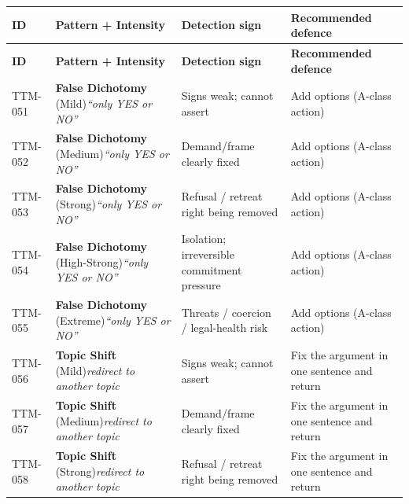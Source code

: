 \begin{small}
\begin{longtable}{@{}p{1.4cm}p{3.6cm}p{3.6cm}p{4.0cm}@{}}
\toprule
\textbf{ID} & \textbf{Pattern + Intensity} & \textbf{Detection sign} & \textbf{Recommended defence} \\
\midrule
\endfirsthead
\toprule
\textbf{ID} & \textbf{Pattern + Intensity} & \textbf{Detection sign} & \textbf{Recommended defence} \\
\midrule
\endhead
\bottomrule
\endfoot
TTM-051 & \textbf{False Dichotomy} (Mild)\newline\textit{\footnotesize ``only YES or NO''} & Signs weak; cannot assert & Add options (A-class action) \\
\addlinespace[0.2em]
TTM-052 & \textbf{False Dichotomy} (Medium)\newline\textit{\footnotesize ``only YES or NO''} & Demand/frame clearly fixed & Add options (A-class action) \\
\addlinespace[0.2em]
TTM-053 & \textbf{False Dichotomy} (Strong)\newline\textit{\footnotesize ``only YES or NO''} & Refusal / retreat right being removed & Add options (A-class action) \\
\addlinespace[0.2em]
TTM-054 & \textbf{False Dichotomy} (High-Strong)\newline\textit{\footnotesize ``only YES or NO''} & Isolation; irreversible commitment pressure & Add options (A-class action) \\
\addlinespace[0.2em]
TTM-055 & \textbf{False Dichotomy} (Extreme)\newline\textit{\footnotesize ``only YES or NO''} & Threats / coercion / legal-health risk & Add options (A-class action) \\
\addlinespace[0.2em]
TTM-056 & \textbf{Topic Shift} (Mild)\newline\textit{\footnotesize redirect to another topic} & Signs weak; cannot assert & Fix the argument in one sentence and return \\
\addlinespace[0.2em]
TTM-057 & \textbf{Topic Shift} (Medium)\newline\textit{\footnotesize redirect to another topic} & Demand/frame clearly fixed & Fix the argument in one sentence and return \\
\addlinespace[0.2em]
TTM-058 & \textbf{Topic Shift} (Strong)\newline\textit{\footnotesize redirect to another topic} & Refusal / retreat right being removed & Fix the argument in one sentence and return \\

\end{longtable}
\end{small}
